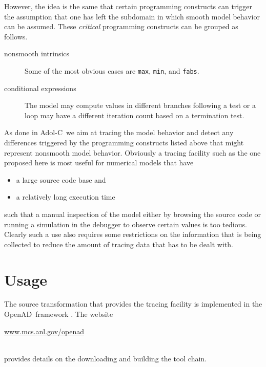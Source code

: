 \documentclass{article}
\newcommand{\adolc}{Adol-C}
\newcommand{\openad}{OpenAD}
\begin{document}
However, the idea is the same that certain programming constructs can
trigger the assumption that one has left the subdomain in which smooth model behavior 
can be assumed. 
These {\em critical} programming constructs can be grouped as follows.
\begin{description}
\item[nonsmooth intrinsics] Some of the most obvious cases are \lstinline{max}, \lstinline{min}, and \lstinline{fabs}.
\item[conditional expressions] The model may compute values in different branches following a test 
or a loop may have a different iteration count based on a termination test.
\end{description}
As done in \adolc\  we aim at tracing the model behavior and detect any differences triggered 
by the programming constructs listed above that might represent nonsmooth model behavior.
Obviously a tracing facility such as the one proposed here is most useful for 
numerical models that have 
\begin{itemize}
\item a large source code base and 
\item a relatively long execution time
\end{itemize}
such that a manual inspection of the model either by browsing the source code or 
running a simulation in the debugger to observe certain values is too tedious.
Clearly such a use also requires some restrictions on the information that is being 
collected to reduce the amount of tracing data that has to be dealt with.


\section{Usage}

The source transformation that provides the tracing facility is implemented in the 
\openad\ framework \cite{openad}. The website\\[1ex] 
\centerline{\url{www.mcs.anl.gov/openad}}\\[1ex]
provides details on the downloading and building the tool chain. 

\end{document}
